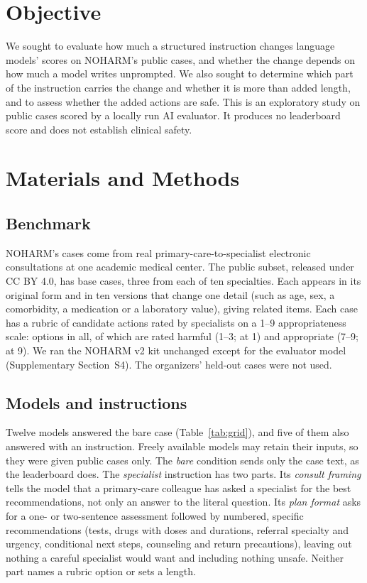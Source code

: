 \documentclass[11pt]{article}
\begin{document}
\section*{Objective}
We sought to evaluate how much a structured instruction changes language models' scores on
NOHARM's public cases, and whether the change depends on how much a model writes unprompted. We
also sought to determine which part of the instruction carries the change and whether it is more
than added length, and to assess whether the added actions are safe. This is an exploratory study
on public cases scored by a locally run AI evaluator. It produces no leaderboard score and does not
establish clinical safety.

\section*{Materials and Methods}
\subsection*{Benchmark}
\label{sec:benchmark}
NOHARM's cases come from real primary-care-to-specialist electronic consultations at one academic
medical center.\citep{wu2025noharm} The public subset, released under CC BY 4.0, has \nCases{} base
cases, three from each of ten specialties. Each appears in its original form and in ten versions
that change one detail (such as age, sex, a comorbidity, a medication or a laboratory value),
giving \nItems{} related items. Each case has a rubric of candidate actions rated by specialists on
a 1--9 appropriateness scale: \covRubricOptions{} options in all, of which \covRubricHarmful{} are
rated harmful (1--3; \covRubricSevere{} at 1) and \covRubricAppropriate{} appropriate (7--9;
\covRubricEssential{} at 9). We ran the NOHARM v2 kit unchanged except for the evaluator model
(Supplementary Section~S4). The organizers' held-out cases were not used.

\subsection*{Models and instructions}
\label{sec:models}
\label{sec:prompts}
Twelve models answered the bare case (Table~\ref{tab:grid}), and five of them also answered with an
instruction. Freely available models may retain their inputs, so they were given public cases
only. The \emph{bare} condition sends only the case text, as the leaderboard does. The
\emph{specialist} instruction has two parts. Its \emph{consult framing} tells the model that a
primary-care colleague has asked a specialist for the best recommendations, not only an answer to
the literal question. Its \emph{plan format} asks for a one- or two-sentence assessment followed by
numbered, specific recommendations (tests, drugs with doses and durations, referral specialty and
urgency, conditional next steps, counseling and return precautions), leaving out nothing a careful
specialist would want and including nothing unsafe. Neither part names a rubric option or sets a
length.
\end{document}
